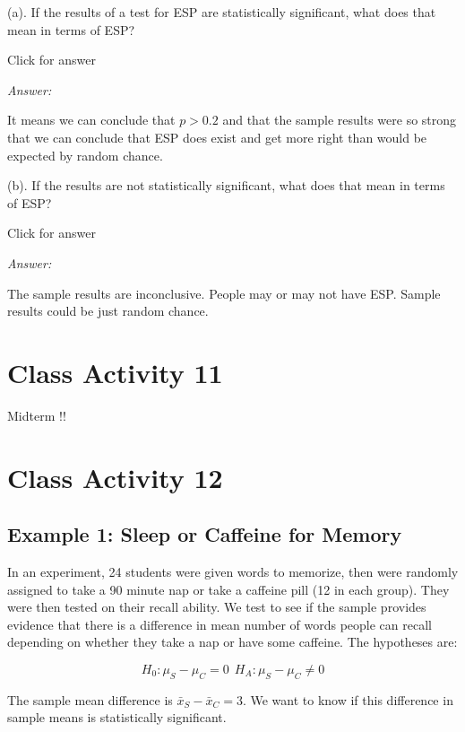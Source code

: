 \documentclass[
]{book}
\begin{document}
(a). If the results of a test for ESP are statistically significant, what does that mean in terms of ESP?

Click for answer

\emph{Answer:}

It means we can conclude that \(p > 0.2\) and that the sample results were so strong that we can conclude that ESP does exist and get more right than would be expected by random chance.

(b). If the results are not statistically significant, what does that mean in terms of ESP?

Click for answer

\emph{Answer:}

The sample results are inconclusive. People may or may not have ESP. Sample results could be just random chance.

\hypertarget{class-activity-11}{%
\chapter{Class Activity 11}\label{class-activity-11}}

Midterm !!

\hypertarget{class-activity-12}{%
\chapter{Class Activity 12}\label{class-activity-12}}

\hypertarget{example-1-sleep-or-caffeine-for-memory}{%
\section{Example 1: Sleep or Caffeine for Memory}\label{example-1-sleep-or-caffeine-for-memory}}

In an experiment, 24 students were given words to memorize, then were randomly assigned to take a 90 minute nap or take a caffeine pill (12 in each group). They were then tested on their recall ability. We test to see if the sample provides evidence that there is a difference in mean number of words people can recall depending on whether they take a nap or have some caffeine. The hypotheses are:

\[
H_0: \mu_S - \mu_C = 0 \ \ H_A: \mu_S - \mu_C \neq 0
\]

The sample mean difference is \(\bar{x}_S - \bar{x}_C = 3\). We want to know if this difference in sample means is statistically significant.
\end{document}
